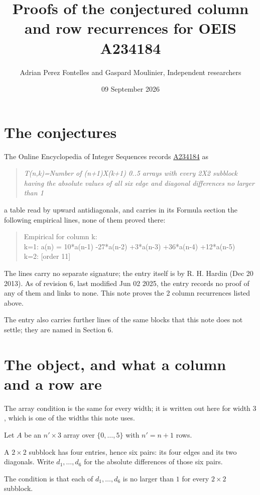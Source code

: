 \documentclass[11pt]{article}
\title{Proofs of the conjectured column and row recurrences for OEIS A234184}
\author{Adrian Perez Fontelles and Gaspard Moulinier, Independent researchers}
\date{09 September 2026}
\theoremstyle{definition}
\begin{document}
\maketitle
\section{The conjectures}

The Online Encyclopedia of Integer Sequences records \href{https://oeis.org/A234184}{A234184} as

\begin{quote}\itshape T(n,k)=Number of (n+1)X(k+1) 0..5 arrays with every 2X2 subblock having the absolute values of all six edge and diagonal differences no larger than 1\end{quote}

a table read by upward antidiagonals, and carries in its Formula section the following empirical lines, none of them proved there:

\begin{quote}\ttfamily Empirical for column k:\\
k=1: a(n) = 10*a(n-1) -27*a(n-2) +3*a(n-3) +36*a(n-4) +12*a(n-5)\\k=2: [order 11]\end{quote}

The lines carry no separate signature; the entry itself is by R. H. Hardin (Dec 20 2013). As of revision 6, last modified Jun 02 2025, the entry records no proof of any of them and links to none. This note proves the 2 column recurrences listed above.

The entry also carries further lines of the same blocks that this note does not settle; they are named in Section 6.

\section{The object, and what a column and a row are}

The array condition is the same for every width; it is written out here for width $3$, which is one of the widths this note uses.

Let $A$ be an $n' \times 3$ array over $\{0,\dots,5\}$ with $n' = n + 1$ rows.

A $2\times2$ subblock has four entries, hence six pairs: its four edges and its two diagonals. Write $d_1,\dots,d_6$ for the absolute differences of those six pairs.

The condition is that each of $d_1,\dots,d_6$ is no larger than $1$ for every $2\times2$ subblock.
\end{document}
